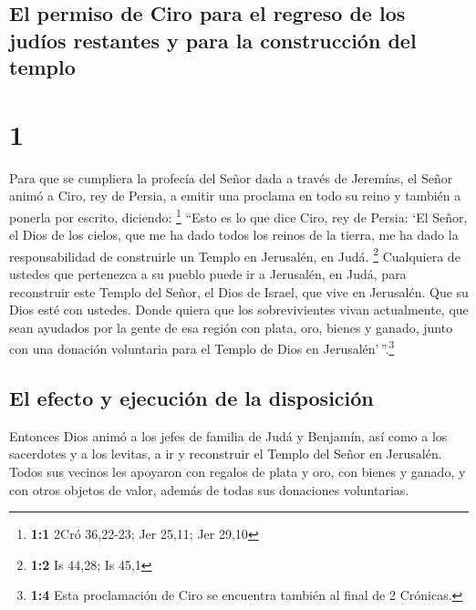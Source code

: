 \hypertarget{el-permiso-de-ciro-para-el-regreso-de-los-juduxedos-restantes-y-para-la-construcciuxf3n-del-templo}{%
\subsection{El permiso de Ciro para el regreso de los judíos restantes y
para la construcción del
templo}\label{el-permiso-de-ciro-para-el-regreso-de-los-juduxedos-restantes-y-para-la-construcciuxf3n-del-templo}}

\hypertarget{section}{%
\section{1}\label{section}}

 Para que se cumpliera la profecía del Señor dada a través
de Jeremías, el Señor animó a Ciro, rey de Persia, a emitir una proclama
en todo su reino y también a ponerla por escrito, diciendo: \footnote{\textbf{1:1}
  2Cró 36,22-23; Jer 25,11; Jer 29,10}  ``Esto es lo que
dice Ciro, rey de Persia: `El Señor, el Dios de los cielos, que me ha
dado todos los reinos de la tierra, me ha dado la responsabilidad de
construirle un Templo en Jerusalén, en Judá. \footnote{\textbf{1:2} Is
  44,28; Is 45,1}  Cualquiera de ustedes que pertenezca a
su pueblo puede ir a Jerusalén, en Judá, para reconstruir este Templo
del Señor, el Dios de Israel, que vive en Jerusalén. Que su Dios esté
con ustedes.  Donde quiera que los sobrevivientes vivan
actualmente, que sean ayudados por la gente de esa región con plata,
oro, bienes y ganado, junto con una donación voluntaria para el Templo
de Dios en Jerusalén'\,''.\footnote{\textbf{1:4} Esta proclamación de
  Ciro se encuentra también al final de 2 Crónicas.}

\hypertarget{el-efecto-y-ejecuciuxf3n-de-la-disposiciuxf3n}{%
\subsection{El efecto y ejecución de la
disposición}\label{el-efecto-y-ejecuciuxf3n-de-la-disposiciuxf3n}}

 Entonces Dios animó a los jefes de familia de Judá y
Benjamín, así como a los sacerdotes y a los levitas, a ir y reconstruir
el Templo del Señor en Jerusalén.  Todos sus vecinos les
apoyaron con regalos de plata y oro, con bienes y ganado, y con otros
objetos de valor, además de todas sus donaciones voluntarias.

